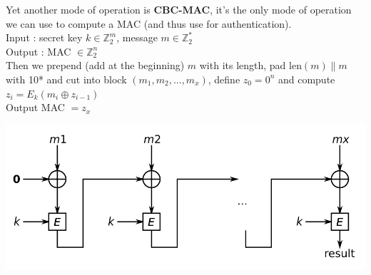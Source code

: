 \documentclass[11pt,a4paper]{report}
\begin{document}
Yet another mode of operation is \textbf{CBC-MAC}, it's the only mode of operation we can use to compute a MAC (and thus use for authentication).\\
Input : secret key $k \in \mathbb{Z}_2^m$, message $m \in \mathbb{Z}_2^*$\\
Output : MAC $\in \mathbb{Z}_2^n$\\
Then we prepend (add at the beginning) $m$ with its length, pad len$(m)\parallel m$ with 10* and cut into block $(m_1,m_2,...,m_x)$, define $z_0 = 0^n$ and compute $z_i = E_k(m_i \oplus z_{i-1})$\\
Output MAC $= z_x$
\begin{center}
\includegraphics[scale=0.6]{img/img11.png}
\end{center}
\end{document}
